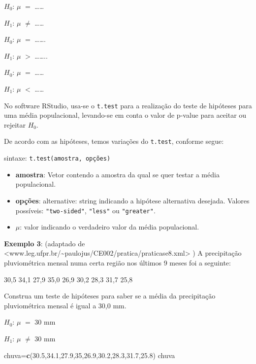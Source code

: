 \documentclass[12pt,brazil,oneside]{book}
\newenvironment{Shaded}{\begin{snugshade}}{\end{snugshade}}
\newcommand{\DecValTok}[1]{\textcolor[rgb]{0.00,0.00,0.81}{#1}}
\newcommand{\FloatTok}[1]{\textcolor[rgb]{0.00,0.00,0.81}{#1}}
\newcommand{\KeywordTok}[1]{\textcolor[rgb]{0.13,0.29,0.53}{\textbf{#1}}}
\newcommand{\NormalTok}[1]{#1}
\providecommand{\tightlist}{%
  \setlength{\itemsep}{0pt}\setlength{\parskip}{0pt}}
\begin{document}
\(H_0\): \(\mu\) \(=\) \ldots{}\ldots{}

\(H_1\): \(\mu\) \(\neq\) \ldots{}\ldots{}

\(H_0\): \(\mu\) \(=\) \ldots{}\ldots{}.

\(H_1\): \(\mu\) \(>\) \ldots{}\ldots{}..

\(H_0\): \(\mu\) \(=\) \ldots{}\ldots{}

\(H_1\): \(\mu\) \(<\) \ldots{}\ldots{}

No software RStudio, usa-se o \texttt{t.test} para a realização do teste de hipóteses para uma média populacional, levando-se em conta o valor de p-value para aceitar ou rejeitar \(H_0\).

De acordo com as hipóteses, temos variações do \texttt{t.test}, conforme segue:

sintaxe: \texttt{t.test(amostra,\ opções)}

\begin{itemize}
\tightlist
\item
  \textbf{amostra}: Vetor contendo a amostra da qual se quer testar a média populacional.
\item
  \textbf{opções}: alternative: string indicando a hipótese alternativa desejada. Valores possíveis: \texttt{"two-sided"}, \texttt{"less"} ou \texttt{"greater"}.
\item
  \(\mu\): valor indicando o verdadeiro valor da média populacional.
\end{itemize}

\textbf{Exemplo 3}: (adaptado de \textless{}www.leg.ufpr.br/\textasciitilde{}paulojus/CE002/pratica/praticase8.xml\textgreater{} ) A precipitação pluviométrica mensal numa certa região nos últimos 9 meses foi a seguinte:

30,5 34,1 27,9 35,0 26,9 30,2 28,3 31,7 25,8

Construa um teste de hipóteses para saber se a média da precipitação pluviométrica mensal é igual a 30,0 mm.

\textbf{\(H_0\)}: \(\mu\) \(=\) 30 mm

\textbf{\(H_1\)}: \(\mu\) \(\neq\) 30 mm

\begin{Shaded}
\begin{Highlighting}[]
\NormalTok{chuva=}\KeywordTok{c}\NormalTok{(}\FloatTok{30.5}\NormalTok{,}\FloatTok{34.1}\NormalTok{,}\FloatTok{27.9}\NormalTok{,}\DecValTok{35}\NormalTok{,}\FloatTok{26.9}\NormalTok{,}\FloatTok{30.2}\NormalTok{,}\FloatTok{28.3}\NormalTok{,}\FloatTok{31.7}\NormalTok{,}\FloatTok{25.8}\NormalTok{)}
\NormalTok{chuva}
\end{Highlighting}
\end{Shaded}
\end{document}
